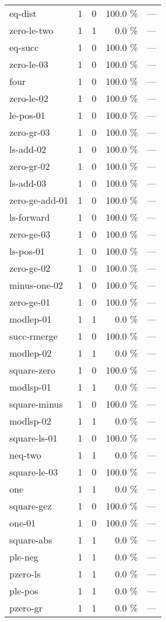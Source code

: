 \documentclass[a4paper]{article}
\begin{document}
\begin{supertabular}{l|r|r|r|r}
eq-dist & 1 & 0 & 100.0 \% & ---\\
zero-le-two & 1 & 1 & 0.0 \% & ---\\
eq-succ & 1 & 0 & 100.0 \% & ---\\
zero-le-03 & 1 & 0 & 100.0 \% & ---\\
four & 1 & 0 & 100.0 \% & ---\\
zero-le-02 & 1 & 0 & 100.0 \% & ---\\
le-pos-01 & 1 & 0 & 100.0 \% & ---\\
zero-gr-03 & 1 & 0 & 100.0 \% & ---\\
ls-add-02 & 1 & 0 & 100.0 \% & ---\\
zero-gr-02 & 1 & 0 & 100.0 \% & ---\\
ls-add-03 & 1 & 0 & 100.0 \% & ---\\
zero-ge-add-01 & 1 & 0 & 100.0 \% & ---\\
ls-forward & 1 & 0 & 100.0 \% & ---\\
zero-ge-03 & 1 & 0 & 100.0 \% & ---\\
ls-pos-01 & 1 & 0 & 100.0 \% & ---\\
zero-ge-02 & 1 & 0 & 100.0 \% & ---\\
minus-one-02 & 1 & 0 & 100.0 \% & ---\\
zero-ge-01 & 1 & 0 & 100.0 \% & ---\\
modlep-01 & 1 & 1 & 0.0 \% & ---\\
succ-rmerge & 1 & 0 & 100.0 \% & ---\\
modlep-02 & 1 & 1 & 0.0 \% & ---\\
square-zero & 1 & 0 & 100.0 \% & ---\\
modlsp-01 & 1 & 1 & 0.0 \% & ---\\
square-minus & 1 & 0 & 100.0 \% & ---\\
modlsp-02 & 1 & 1 & 0.0 \% & ---\\
square-ls-01 & 1 & 0 & 100.0 \% & ---\\
neq-two & 1 & 1 & 0.0 \% & ---\\
square-le-03 & 1 & 0 & 100.0 \% & ---\\
one & 1 & 1 & 0.0 \% & ---\\
square-gez & 1 & 0 & 100.0 \% & ---\\
one-01 & 1 & 0 & 100.0 \% & ---\\
square-abs & 1 & 1 & 0.0 \% & ---\\
ple-neg & 1 & 1 & 0.0 \% & ---\\
pzero-ls & 1 & 1 & 0.0 \% & ---\\
ple-pos & 1 & 1 & 0.0 \% & ---\\
pzero-gr & 1 & 1 & 0.0 \% & ---\\

\end{supertabular}
\end{document}
